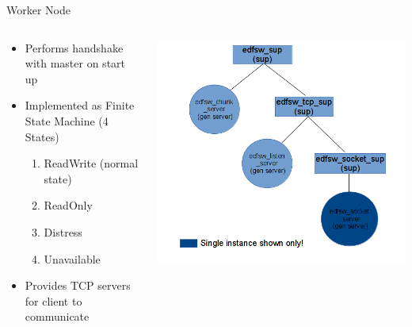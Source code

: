 \documentclass{beamer}
\begin{document}
\begin{frame}{Worker Node}
\begin{columns}
    \begin{column}{0.5\textwidth}
        \begin{itemize}
        \item Performs handshake with master on start up
        \item Implemented as Finite State Machine (4 States)
        \begin{enumerate}
        \item ReadWrite (normal state)
        \item ReadOnly \item Distress
        \item Unavailable
        \end{enumerate}
        \item Provides TCP servers for client to communicate
        \end{itemize}
    \end{column}
    \begin{column}{0.5\textwidth}
        \includegraphics[scale=0.3]{images/worker_otp_layout}
    \end{column}
\end{columns}
\end{frame}
\end{document}
